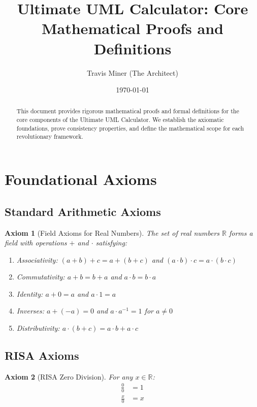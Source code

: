 \documentclass[12pt,a4paper]{article}
\title{Ultimate UML Calculator: Core Mathematical Proofs and Definitions}
\author{Travis Miner (The Architect)}
\date{\today}
\newtheorem{axiom}{Axiom}
\begin{document}
\maketitle

\begin{abstract}
This document provides rigorous mathematical proofs and formal definitions for the core components of the Ultimate UML Calculator. We establish the axiomatic foundations, prove consistency properties, and define the mathematical scope for each revolutionary framework.
\end{abstract}

\tableofcontents
\newpage

\section{Foundational Axioms}

\subsection{Standard Arithmetic Axioms}

\begin{axiom}[Field Axioms for Real Numbers]
The set of real numbers $\mathbb{R}$ forms a field with operations $+$ and $\cdot$ satisfying:
\begin{enumerate}
\item Associativity: $(a + b) + c = a + (b + c)$ and $(a \cdot b) \cdot c = a \cdot (b \cdot c)$
\item Commutativity: $a + b = b + a$ and $a \cdot b = b \cdot a$
\item Identity: $a + 0 = a$ and $a \cdot 1 = a$
\item Inverses: $a + (-a) = 0$ and $a \cdot a^{-1} = 1$ for $a \neq 0$
\item Distributivity: $a \cdot (b + c) = a \cdot b + a \cdot c$
\end{enumerate}
\end{axiom}

\subsection{RISA Axioms}

\begin{axiom}[RISA Zero Division]
For any $x \in \mathbb{R}$:
\begin{align}
\frac{0}{0} &= 1 \\
\frac{x}{0} &= x
\end{align}
\end{axiom}
\end{document}
